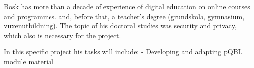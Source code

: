 Bosk has more than a decade of experience of digital education on online 
courses and programmes.  and, before that, a teacher’s degree (grundskola, 
gymnasium, vuxenutbildning). The topic of his doctoral studies was security and 
privacy, which also is necessary for the project. 

In this specific project his tasks will include:
- Developing and adapting pQBL module material
